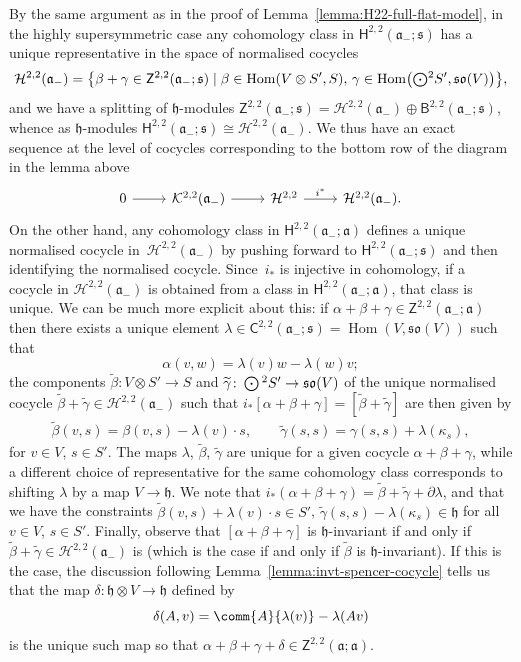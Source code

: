 \documentclass[pdftex]{sigma}
\numberwithin{equation}{section}
\newcommand{\fa}{\mathfrak{a}}
\newcommand{\fh}{\mathfrak{h}}
\newcommand{\fs}{\mathfrak{s}}
\newcommand{\fso}{\mathfrak{so}}
\newcommand{\cH}{\mathcal{H}}
\newcommand{\cK}{\mathcal{K}}
\newcommand{\ssB}{\mathsf{B}}
\newcommand{\ssC}{\mathsf{C}}
\newcommand{\ssH}{\mathsf{H}}
\newcommand{\ssZ}{\mathsf{Z}}
\newcommand{\betatilde}{\widetilde{\beta}}
\newcommand{\gammatilde}{\widetilde{\gamma}}
\newcommand{\Odot}{\mathchoice{{\textstyle\bigodot}}{\bigodot}{\bigodot}{\bigodot}}
\newcommand{\1}{\mathbbm{1}}
\DeclareMathOperator{\Hom}{Hom}
\begin{document}
By the same argument as in the proof of Lemma~\ref{lemma:H22-full-flat-model}, in the highly supersymmetric case any cohomology class in $\ssH^{2,2}(\fa_-;\fs)$ has a unique representative in the space of normalised cocycles
\[%
	\cH^{2,2}(\fa_-)
	= \bigl\{\beta+\gamma \in \ssZ^{2,2}(\fa_-;\fs)
		\mid
			\beta\in\Hom(V\otimes S',S),\,
			\gamma\in\Hom\bigl(\Odot^2S',\fso(V)\bigr)\bigr\},
\]
and we have a splitting of $\fh$-modules $\ssZ^{2,2}(\fa_-;\fs)=\cH^{2,2}(\fa_-)\oplus\ssB^{2,2}(\fa_-;\fs)$, whence as $\fh$-modules $\ssH^{2,2}(\fa_-;\fs) \cong \cH^{2,2}(\fa_-)$. We thus have an exact sequence at the level of cocycles corresponding to the bottom row of the diagram in the lemma above
\[
\begin{tikzcd}
	0 \arrow[r]
	& \cK^{2,2}(\fa_-) \arrow[r]
	& \cH^{2,2} \arrow[r, "i^*"]
	& \cH^{2,2}(\fa_-).
\end{tikzcd}
\]
On the other hand, any cohomology class in $\ssH^{2,2}(\fa_-;\fa)$ defines a unique normalised cocycle in~$\cH^{2,2}(\fa_-)$ by pushing forward to $\ssH^{2,2}(\fa_-;\fs)$ and then identifying the normalised cocycle. Since~$i_*$ is injective in cohomology, if a cocycle in $\cH^{2,2}(\fa_-)$ is obtained from a class in $\ssH^{2,2}(\fa_-;\fa)$, that class is unique. We can be much more explicit about this: if $\alpha+\beta+\gamma\in\ssZ^{2,2}(\fa_-;\fa)$ then there exists a unique element $\lambda\in\ssC^{2,2}(\fa_-;\fs)=\Hom(V,\fso(V))$ such that
\begin{equation}\label{eq:alpha-lambda}
	\alpha(v,w) = \lambda(v)w - \lambda(w)v;
\end{equation}
the components $\betatilde\colon V\otimes S' \to S$ and $\gammatilde\colon \Odot^2 S' \to \fso(V)$ of the unique normalised cocycle $\betatilde+\gammatilde\in\cH^{2,2}(\fa_-)$ such that $i_*[\alpha+\beta+\gamma]=[\betatilde+\gammatilde]$ are then given by
\begin{align}%
	\betatilde(v,s) = \beta(v,s) - \lambda(v)\cdot s,\qquad
	\gammatilde(s,s) = \gamma(s,s) + \lambda(\kappa_s), \label{eq:gamma-tilde}
\end{align}
for $v\in V$, $s\in S'$. The maps $\lambda$, $\betatilde$, $\gammatilde$ are unique for a given cocycle $\alpha+\beta+\gamma$, while a different choice of representative for the same cohomology class corresponds to shifting $\lambda$ by a map $V\to\fh$. We note that
$i_*(\alpha+\beta+\gamma) = \betatilde+\gammatilde+\partial\lambda$,
and that we have the constraints
$\betatilde(v,s) + \lambda(v)\cdot s \in S'$, $
	\gammatilde(s,s) - \lambda(\kappa_s) \in \fh$
for all $v\in V$, $s\in S'$. Finally, observe that $[\alpha+\beta+\gamma]$ is $\fh$-invariant if and only if $\betatilde+\gammatilde\in\cH^{2,2}(\fa_-)$ is (which is the case if and only if $\betatilde$ is $\fh$-invariant). If this is the case, the discussion following Lemma~\ref{lemma:invt-spencer-cocycle} tells us that the map $\delta\colon \fh\otimes V\to\fh$ defined by
\begin{equation}\label{eq:delta-lambda}
	\delta(A,v) = \comm{A}{\lambda(v)} - \lambda(Av)
\end{equation}
is the unique such map so that $\alpha+\beta+\gamma+\delta\in\ssZ^{2,2}(\fa;\fa)$.
\end{document}
